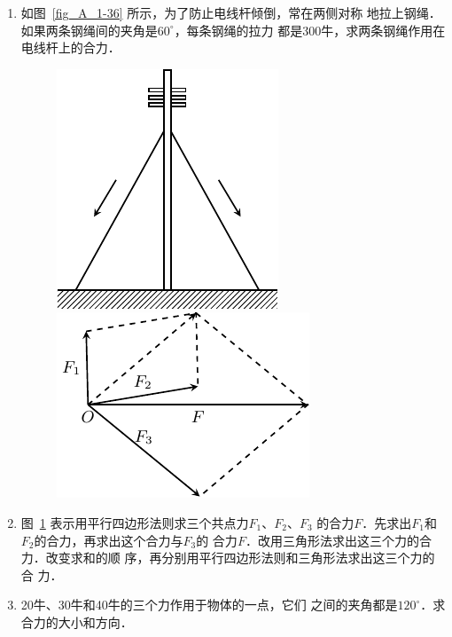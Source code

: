 \begin{enumerate} 
\item   如图~\ref{fig_A_1-36} 所示，为了防止电线杆倾倒，常在两侧对称
地拉上钢绳．如果两条钢绳间的夹角是$60^\circ$，每条钢绳的拉力
都是300牛，求两条钢绳作用在电线杆上的合力．

\begin{figure}[htbp]
    \centering
    \begin{minipage} [t]{0.48\textwidth} 
        \centering
        \includegraphics{fig/A/1-36.pdf} 
        \caption{} \label{fig_A_1-36} 
    \end{minipage} 
    \begin{minipage} [t]{0.48\textwidth} 
        \centering
        \includegraphics{fig/A/1-37.pdf} 
        \caption{} \label{fig_A_1-37} 
    \end{minipage} 
\end{figure} 


\item  图~\ref{fig_A_1-37} 表示用平行四边形法则求三个共点力$F_1$、$F_2$、$F_3$
的合力$F$．先求出$F_1$和$F_2$的合力，再求出这个合力与$F_3$的
合力$F$．改用三角形法求出这三个力的合力．改变求和的顺
序，再分别用平行四边形法则和三角形法求出这三个力的合
力．



\item   20牛、30牛和40牛的三个力作用于物体的一点，它们
之间的夹角都是$120^\circ$．求合力的大小和方向．


\end{enumerate}
